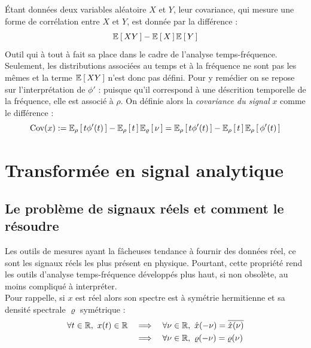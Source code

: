 \begin{definition}[Covariance]\label{def:cova_signal}
	Étant données deux variables aléatoire $X$ et $Y$, leur covariance, qui mesure une forme de corrélation entre $X$ et $Y$, est donnée par la différence :
	\[\esp{XY}-\esp{X}\esp{Y}\]
	Outil qui à tout à fait sa place dans le cadre de l'analyse temps-fréquence. Seulement, les distributions associées au temps et à la fréquence ne sont pas les mêmes et la terme $\esp{XY}$ n'est donc pas défini.
	Pour y remédier on se repose sur l'interprétation de $\phi'$ : puisque qu'il correspond à une déscrition temporelle de la fréquence, elle est associé à $\rho$. On définie alors la \emph{covariance du signal} $x$ comme le différence :
	\begin{equation}\label{eq:cov_signal}
		\text{Cov}(x) \defeq \esp[\rho]{t\phi'(t)} - \esp[\rho]{t} \esp[\varrho]{\nu} = \esp[\rho]{t\phi'(t)} - \esp[\rho]{t} \esp[\rho]{\phi'(t)}
	\end{equation}
\end{definition}



\section{Transformée en signal analytique}

\subsection{Le problème de signaux réels et comment le résoudre}


Les outils de mesures ayant la fâcheuses tendance à fournir des données réel, ce sont les signaux réels les plus présent en physique.
Pourtant, cette propriété rend les outils d'analyse temps-fréquence développés plus haut, si non obsolète, au moins compliqué à interpréter.
\\
Pour rappelle, si $x$ est réel alors son spectre est à symétrie hermitienne et sa densité spectrale $\varrho$ symétrique :
\begin{align*}
\forall t\in\R,\ x(t)\in\R \quad &\Lr \quad \forall \nu\in\R,\ \hat{x}(-\nu) = \congu{\hat{x}(\nu)} \\
	&\Lr \quad \forall \nu\in\R,\ \varrho(-\nu) = \varrho(\nu)
\end{align*}
\\


